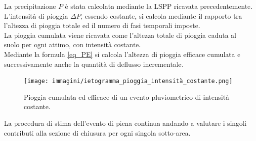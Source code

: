 La precipitazione $P$ è stata calcolata mediante la LSPP ricavata precedentemente.\\
L'intensità di pioggia $\Delta P$, essendo costante, si calcola mediante il rapporto tra l'altezza di pioggia totale ed il numero di fasi temporali imposte.\\
La pioggia cumulata viene ricavata come l'altezza totale di pioggia caduta al suolo per ogni attimo, con intensità costante.\\
Mediante la formula \ref{eq_PE} si calcola l'altezza di pioggia efficace cumulata e successivamente anche la quantità di deflusso incrementale. 
\begin{figure}[H]  \centering
    \texttt{[image: immagini/ietogramma\_pioggia\_intensità\_costante.png]}
    \caption{Pioggia cumulata ed efficace di un evento pluviometrico di intensità costante.}
    \label{ietogramma_pioggia_intensità_costante}
\end{figure}

La procedura di stima dell'evento di piena continua andando a valutare i singoli contributi alla sezione di chiusura per ogni singola sotto-area.

